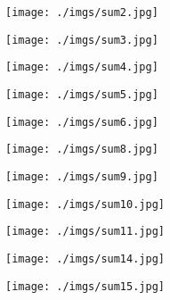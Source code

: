 \documentclass[12pt]{examnotes}
\begin{document}
\obeylines  
\setlength\baselineskip{15pt}

\texttt{[image: ./imgs/sum2.jpg]}

\texttt{[image: ./imgs/sum3.jpg]}

\texttt{[image: ./imgs/sum4.jpg]}

\texttt{[image: ./imgs/sum5.jpg]}

\texttt{[image: ./imgs/sum6.jpg]}

\texttt{[image: ./imgs/sum8.jpg]}

\texttt{[image: ./imgs/sum9.jpg]}

\texttt{[image: ./imgs/sum10.jpg]}

\texttt{[image: ./imgs/sum11.jpg]}

\texttt{[image: ./imgs/sum14.jpg]}

\texttt{[image: ./imgs/sum15.jpg]}







\end{document}
